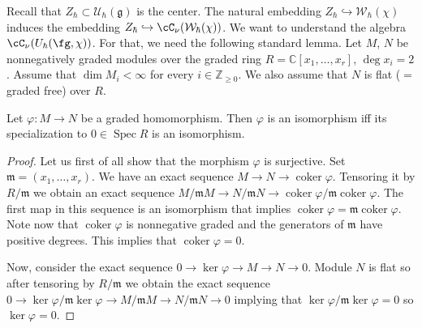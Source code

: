 \documentclass[12pt]{amsart}
\begin{document}
Recall that $Z_\hbar \subset \mathcal{U}_\hbar(\mathfrak{g})$ is the center. 
The natural embedding $Z_\hbar \hookrightarrow \mathcal{W}_\hbar(\chi)$ induces the embedding $Z_\hbar \hookrightarrow \cC_\nu(\mathcal{W}_\hbar(\chi))$. We want to understand the algebra $\cC_{\nu}(U_{\hbar}(\fg, \chi))$. For that, we need the following standard lemma. Let $M$, $N$ be nonnegatively graded modules over the graded ring $R=\mathbb{C}[x_1,\ldots,x_r]$,  $\operatorname{deg}x_i=2$. Assume  that $\operatorname{dim}M_i < \infty$ for every $i \in \mathbb{Z}_{\geqslant 0}$. We also assume that $N$ is flat ($=$ graded free) over $R$.
\begin{lemma}\label{lemma_iso_enough_for_hbar_zero}
 Let $\varphi\colon M \rightarrow N$ be a graded homomorphism. Then  $\varphi$ is an isomorphism iff its specialization to $0 \in \operatorname{Spec}R$ is an isomorphism.
\end{lemma}
\begin{proof}

Let us first of all show that the morphism $\varphi$ is surjective. Set $\mathfrak{m}=(x_1,\ldots,x_r)$. We have an exact sequence $M \rightarrow N \rightarrow \operatorname{coker}\varphi$. Tensoring it by $R/\mathfrak{m}$ we obtain an exact sequence $M/\mathfrak{m}M \rightarrow N/\mathfrak{m}N \rightarrow \operatorname{coker}\varphi/\mathfrak{m}\operatorname{coker}\varphi$. The first map in this sequence is an isomorphism that implies $\operatorname{coker}\varphi = \mathfrak{m}\operatorname{coker}\varphi$. Note now that $\operatorname{coker}\varphi$ is nonnegative graded and the generators of $\mathfrak{m}$ have positive degrees. This implies that $\operatorname{coker}\varphi=0$. 

Now, consider the exact sequence $0 \rightarrow \operatorname{ker}\varphi \rightarrow M \rightarrow N \rightarrow 0$. Module $N$ is flat so after tensoring by $R/\mathfrak{m}$ we obtain the exact sequence $0 \rightarrow \operatorname{ker}\varphi/\mathfrak{m}\operatorname{ker}\varphi \rightarrow  M/\mathfrak{m}M \rightarrow N/\mathfrak{m}N \rightarrow 0$ implying that $\operatorname{ker}\varphi/\mathfrak{m}\operatorname{ker}\varphi=0$ so $\operatorname{ker}\varphi=0$.
\end{proof}

 
\end{document}
